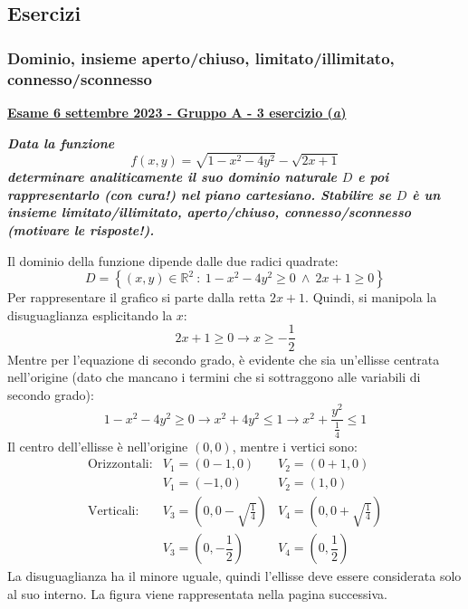 \documentclass[a4paper]{article}
\newcommand{\definition}[1]{\textcolor{Red3}{\textbf{#1}}}
\newcommand{\example}[1]{\textcolor{Green4}{\textbf{#1}}}
\begin{document}
	\subsection{Esercizi}

	\subsubsection{Dominio, insieme aperto/chiuso, limitato/illimitato, connesso/sconnesso}

	\begin{flushleft}\label{exam: esame 06 settembre 2023 - Gruppo A - 3 esercizio (a)}
		\definition{\underline{Esame 6 settembre 2023 - Gruppo A - 3 esercizio (\emph{a})}}
	\end{flushleft}
	\example{\emph{Data la funzione}
	\begin{equation*}
		f\left(x,y\right) = \sqrt{1-x^{2}-4y^{2}} - \sqrt{2x+1}
	\end{equation*}
	\emph{determinare analiticamente il suo dominio naturale $D$ e poi rappresentarlo (con cura!) nel piano cartesiano. Stabilire se $D$ è un insieme limitato/illimitato, aperto/chiuso, connesso/sconnesso (motivare le risposte!).}}\newline

	\noindent
	Il dominio della funzione dipende dalle due radici quadrate:
	\begin{equation*}
		D = \left\{\left(x,y\right) \in \mathbb{R}^{2} \: : \: 1 - x^{2} - 4y^{2} \ge 0 \: \land \: 2x + 1 \ge 0\right\}
	\end{equation*}
	Per rappresentare il grafico si parte dalla retta $2x+1$. Quindi, si manipola la disuguaglianza esplicitando la $x$:
	\begin{equation*}
		2x+1 \ge 0 \longrightarrow x \ge -\dfrac{1}{2}
	\end{equation*}
	Mentre per l'equazione di secondo grado, è evidente che sia un'ellisse centrata nell'origine (dato che mancano i termini che si sottraggono alle variabili di secondo grado):
	\begin{equation*}
		1 - x^{2} - 4y^{2} \ge 0 \longrightarrow x^{2} + 4y^{2} \le 1 \longrightarrow x^{2} + \dfrac{y^{2}}{\frac{1}{4}} \le 1
	\end{equation*}
	Il centro dell'ellisse è nell'origine $\left(0,0\right)$, mentre i vertici sono:
	\begin{equation*}
		\begin{array}{lll}
			\text{Orizzontali:} & V_{1}=\left(0-1,0\right) 	& V_{2}=\left(0+1,0\right) \\ [.3em]
								& V_{1}=\left(-1,0\right)	& V_{2}=\left(1,0\right) \\ [1em]
			\text{Verticali:}	& V_{3}=\left(0,0-\sqrt{\frac{1}{4}}\right) & V_{4}=\left(0,0+\sqrt{\frac{1}{4}}\right) \\ [.8em]
								& V_{3}=\left(0,-\dfrac{1}{2}\right) & V_{4}=\left(0,\dfrac{1}{2}\right)
		\end{array}
	\end{equation*}
	La disuguaglianza ha il minore uguale, quindi l'ellisse deve essere considerata solo al suo interno. La figura viene rappresentata nella pagina successiva.\newpage
\end{document}
